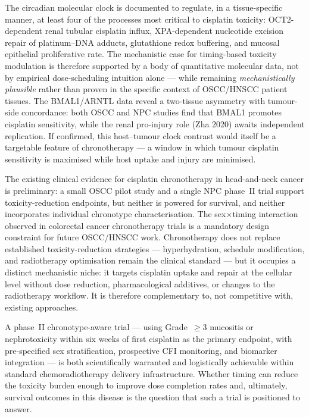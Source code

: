 \documentclass[preprint,review,12pt]{elsarticle}
\begin{document}
The circadian molecular clock is documented to regulate, in a
tissue-specific manner, at least four of the processes most critical
to cisplatin toxicity: OCT2-dependent renal tubular cisplatin
influx, XPA-dependent nucleotide excision repair of platinum--DNA
adducts, glutathione redox buffering, and mucosal epithelial
proliferative rate.  The mechanistic case for timing-based toxicity modulation is therefore
supported by a body of quantitative molecular data, not by empirical
dose-scheduling intuition alone --- while remaining \emph{mechanistically
plausible} rather than proven in the specific context of OSCC/HNSCC
patient tissues.  The BMAL1/ARNTL data reveal a two-tissue asymmetry
with tumour-side concordance: both OSCC and NPC studies find that
BMAL1 promotes cisplatin sensitivity, while the renal pro-injury role
(Zha 2020) awaits independent replication.  If confirmed, this
host--tumour clock contrast would itself be a targetable feature of
chronotherapy --- a window in which tumour cisplatin sensitivity is
maximised while host uptake and injury are minimised.

The existing clinical evidence for cisplatin chronotherapy in
head-and-neck cancer is preliminary: a small OSCC pilot study and
a single NPC phase~II trial support toxicity-reduction endpoints,
but neither is powered for survival, and neither incorporates
individual chronotype characterisation.  The sex$\times$timing
interaction observed in colorectal cancer chronotherapy trials
is a mandatory design constraint for future OSCC/HNSCC work.
Chronotherapy does not replace established toxicity-reduction strategies
--- hyperhydration, schedule modification, and radiotherapy optimisation
remain the clinical standard --- but it occupies a distinct mechanistic
niche: it targets cisplatin uptake and repair at the cellular level
without dose reduction, pharmacological additives, or changes to the
radiotherapy workflow.  It is therefore complementary to, not competitive
with, existing approaches.

A phase~II chronotype-aware trial --- using Grade~$\geq$3 mucositis or
nephrotoxicity within six weeks of first cisplatin as the primary endpoint,
with pre-specified sex stratification, prospective CFI monitoring, and
biomarker integration --- is both scientifically warranted and logistically
achievable within standard chemoradiotherapy delivery infrastructure.
Whether timing can reduce the toxicity burden enough to improve dose
completion rates and, ultimately, survival outcomes in this disease is
the question that such a trial is positioned to answer.
\end{document}
